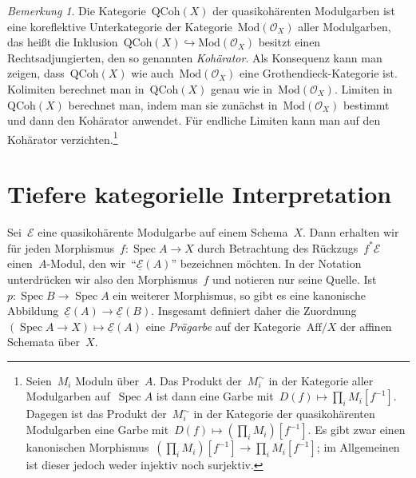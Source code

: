 \documentclass[a4paper,ngerman,12pt]{scrartcl}
\theoremstyle{definition}
\theoremstyle{plain}
\theoremstyle{remark}
\newtheorem{rem}[defn]{Bemerkung}
\newcommand{\E}{\mathcal{E}}
\renewcommand{\O}{\mathcal{O}}
\newcommand{\ul}[1]{\underline{#1}}
\DeclareMathOperator{\Spec}{Spec}
\begin{document}
\begin{rem}Die Kategorie~$\mathrm{QCoh}(X)$ der quasikohärenten Modulgarben ist
eine koreflektive Unterkategorie der Kategorie~$\mathrm{Mod}(\O_X)$
aller Modulgarben, das heißt die Inklusion~$\mathrm{QCoh}(X) \hookrightarrow
\mathrm{Mod}(\O_X)$ besitzt einen Rechtsadjungierten, den so genannten
\emph{Kohärator}. Als Konsequenz kann man zeigen, dass~$\mathrm{QCoh}(X)$ wie
auch~$\mathrm{Mod}(\O_X)$ eine Grothendieck-Kategorie ist. Kolimiten berechnet
man in~$\mathrm{QCoh}(X)$ genau wie in~$\mathrm{Mod}(\O_X)$. Limiten
in~$\mathrm{QCoh}(X)$ berechnet man, indem man sie zunächst
in~$\mathrm{Mod}(\O_X)$ bestimmt und dann den Kohärator anwendet. Für
endliche Limiten kann man auf den Kohärator verzichten.\footnote{Seien~$M_i$
Moduln über~$A$. Das Produkt der~$M_i^\sim$ in der Kategorie aller Modulgarben
auf~$\Spec A$ ist dann eine Garbe mit~$D(f) \mapsto \prod_i M_i[f^{-1}]$.
Dagegen ist das Produkt der~$M_i^\sim$ in der Kategorie der quasikohärenten
Modulgarben eine Garbe mit~$D(f) \mapsto (\prod_i M_i)[f^{-1}]$. Es gibt zwar
einen kanonischen Morphismus~$(\prod_i M_i)[f^{-1}] \to \prod_i M_i[f^{-1}]$;
im Allgemeinen ist dieser jedoch weder injektiv noch surjektiv.}\end{rem}



\section{Tiefere kategorielle Interpretation}

Sei~$\E$ eine quasikohärente Modulgarbe auf einem Schema~$X$. Dann erhalten wir
für jeden Morphismus~$f : \Spec A \to X$ durch Betrachtung des Rückzugs~$f^*\E$
einen~$A$-Modul, den wir~"`$\ul{\E}(A)$"' bezeichnen möchten. In der Notation
unterdrücken wir also den Morphismus~$f$ und notieren nur seine Quelle.
Ist~$p : \Spec B \to \Spec A$ ein weiterer Morphismus, so gibt es eine
kanonische Abbildung~$\ul{\E}(A) \to \ul{\E}(B)$. Insgesamt definiert daher die
Zuordnung~$(\Spec A \to X) \mapsto \ul{\E}(A)$ eine \emph{Prägarbe} auf der
Kategorie~$\mathrm{Aff}/X$ der affinen Schemata über~$X$.
\end{document}
